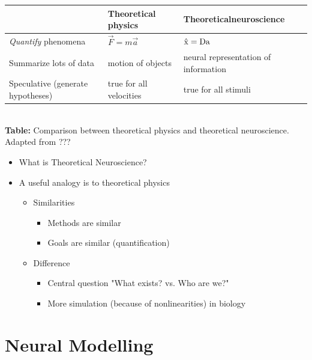 \documentclass[10pt,letterpaper,oneside]{article}
\begin{document}
{\centering
	\begin{tabular}{p{4cm} p{4cm} p{4cm}}
		\toprule
								  &
								  \textbf{Theoretical physics} & \textbf{Theoretical\newline neuroscience} \\
		\midrule
		\raggedright\emph{Quantify} phenomena & $\vec{F} = m \vec{a}$ & $\hat{{\mathbf{\mathrm{x}}}} = {\mathbf{\mathrm{D}}} {\mathbf{\mathrm{a}}}$ \\
		\midrule
		\raggedright Summarize lots of data & motion of objects & neural representation of information \\
		\midrule
		\raggedright Speculative (generate hypotheses) & true for all velocities & true for all stimuli \\
		\bottomrule
	\end{tabular}\\\textbf{Table:} Comparison between theoretical physics and theoretical neuroscience. Adapted from ???}

\begin{itemize}
	\item What is Theoretical Neuroscience?
	\item A useful analogy is to theoretical physics
	\begin{itemize}
		\item Similarities
		\begin{itemize}
			\item Methods are similar
			\item Goals are similar (quantification)
		\end{itemize}
		\item Difference
		\begin{itemize}
			\item Central question "What exists? vs. Who are we?"
			\item More simulation (because of nonlinearities) in biology
		\end{itemize}
	\end{itemize}
\end{itemize}

\section{Neural Modelling}
\end{document}
